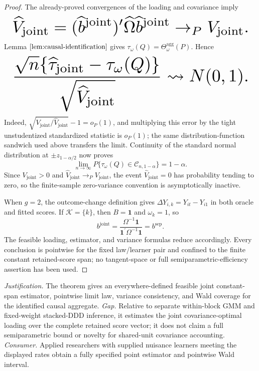 \documentclass{article}
\begin{document}
\begin{proof}
The already-proved convergences of the loading and covariance imply
\[
\makebox[\linewidth][c]{\resizebox{0.98\linewidth}{!}{\(\displaystyle \widehat V_{\mathrm{joint}}
=(\widehat b^{\mathrm{joint}})^{\prime}
 \widehat\Omega\widehat b^{\mathrm{joint}}
\to_PV_{\mathrm{joint}}.\)}}
\]
Lemma \(\ref{lem:causal-identification}\) gives \(\tau_\omega(Q)=\Theta_\omega^{\mathrm{agg}}(P)\). Hence
\[
\makebox[\linewidth][c]{\resizebox{0.98\linewidth}{!}{\(\displaystyle \frac{\sqrt n\{\widehat\tau_{\mathrm{joint}}-\tau_\omega(Q)\}}
     {\sqrt{\widehat V_{\mathrm{joint}}}}
\rightsquigarrow N(0,1).\)}}
\]
Indeed, \(\sqrt{V_{\mathrm{joint}}/\widehat V_{\mathrm{joint}}}-1=o_P(1)\), and multiplying this error by the tight unstudentized standardized statistic is \(o_P(1)\); the same distribution-function sandwich used above transfers the limit. Continuity of the standard normal distribution at \(\pm z_{1-\alpha/2}\) now proves
\[
\lim_{n\to\infty}P\{\tau_\omega(Q)\in\mathcal C_{n,1-\alpha}\}=1-\alpha.
\]
Since \(V_{\mathrm{joint}}>0\) and \(\widehat V_{\mathrm{joint}}\to_PV_{\mathrm{joint}}\), the event \(\widehat V_{\mathrm{joint}}=0\) has probability tending to zero, so the finite-sample zero-variance convention is asymptotically inactive.

When \(g=2\), the outcome-change definition gives \(\Delta Y_{i,k}=Y_{it}-Y_{i1}\) in both oracle and fitted scores. If \(\mathcal K=\{k\}\), then \(B=\mathbf 1\) and \(\omega_k=1\), so
\[
b^{\mathrm{joint}}
=\frac{\Omega^{-1}\mathbf 1}{\mathbf 1^{\prime}\Omega^{-1}\mathbf 1}
=b^{\mathrm{sep}}.
\]
The feasible loading, estimator, and variance formulas reduce accordingly. Every conclusion is pointwise for the fixed law/learner pair and confined to the finite constant retained-score span; no tangent-space or full semiparametric-efficiency assertion has been used.
\end{proof}
\par\smallskip\noindent \textit{Justification.} The theorem gives an everywhere-defined feasible joint constant-span estimator, pointwise limit law, variance consistency, and Wald coverage for the identified causal aggregate. \textit{Gap.} Relative to separate within-block GMM and fixed-weight stacked-DDD inference, it estimates the joint covariance-optimal loading over the complete retained score vector; it does not claim a full semiparametric bound or novelty for shared-unit covariance accounting. \textit{Consumer.} Applied researchers with supplied nuisance learners meeting the displayed rates obtain a fully specified point estimator and pointwise Wald interval.
\end{document}
